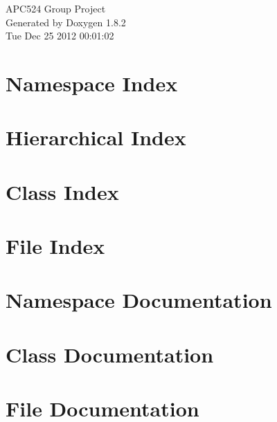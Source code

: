 \documentclass{book}
\begin{document}
\hypersetup{pageanchor=false,citecolor=blue}
\begin{titlepage}
\vspace*{7cm}
\begin{center}
{\Large A\-P\-C524 Group Project }\\
\vspace*{1cm}
{\large Generated by Doxygen 1.8.2}\\
\vspace*{0.5cm}
{\small Tue Dec 25 2012 00:01:02}\\
\end{center}
\end{titlepage}
\clearemptydoublepage
{}
\tableofcontents
\clearemptydoublepage
{}
\hypersetup{pageanchor=true,citecolor=blue}
\chapter{Namespace Index}

\chapter{Hierarchical Index}

\chapter{Class Index}

\chapter{File Index}

\chapter{Namespace Documentation}

\chapter{Class Documentation}














\chapter{File Documentation}


























\printindex
\end{document}
